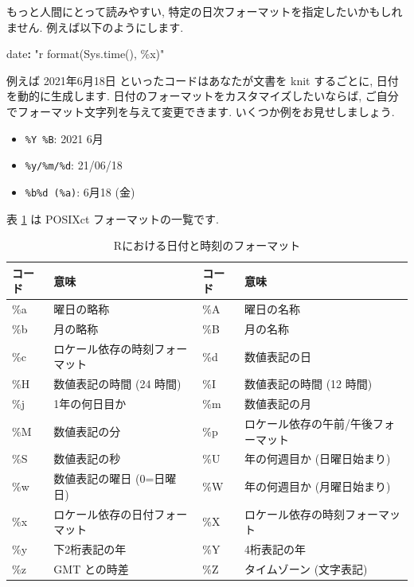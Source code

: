\documentclass[
  11pt,
  lualatex,
  ja=standard]{bxjsreport}
\newenvironment{Shaded}{\begin{snugshade}}{\end{snugshade}}
\newcommand{\AttributeTok}[1]{\textcolor[rgb]{0.77,0.63,0.00}{#1}}
\newcommand{\FunctionTok}[1]{\textcolor[rgb]{0.00,0.00,0.00}{#1}}
\newcommand{\KeywordTok}[1]{\textcolor[rgb]{0.13,0.29,0.53}{\textbf{#1}}}
\newcommand{\StringTok}[1]{\textcolor[rgb]{0.31,0.60,0.02}{#1}}
\providecommand{\tightlist}{%
  \setlength{\itemsep}{0pt}\setlength{\parskip}{0pt}}
\begin{document}
もっと人間にとって読みやすい, 特定の日次フォーマットを指定したいかもしれません. 例えば以下のようにします.

\begin{Shaded}
\begin{Highlighting}[]
\FunctionTok{date}\KeywordTok{:}\AttributeTok{ }\StringTok{"\textasciigrave{}r format(Sys.time(), \textquotesingle{}\%x\textquotesingle{})\textasciigrave{}"}
\end{Highlighting}
\end{Shaded}

例えば 2021年6月18日 といったコードはあなたが文書を knit するごとに, 日付を動的に生成します. 日付のフォーマットをカスタマイズしたいならば, ご自分でフォーマット文字列を与えて変更できます. いくつか例をお見せしましょう.

\begin{itemize}
\tightlist
\item
  \texttt{\%Y \%B}: 2021 6月
\item
  \texttt{\%y/\%m/\%d}: 21/06/18
\item
  \texttt{\%b\%d (\%a)}: 6月18 (金)
\end{itemize}

表 \ref{tab:date-format} は POSIXct フォーマットの一覧です.

\begin{table}
\caption{\label{tab:date-format} Rにおける日付と時刻のフォーマット}\tabularnewline
\begin{tabular}{llll}
\toprule
コード & 意味 & コード & 意味 \\
\midrule

\%a & 曜日の略称 & \%A & 曜日の名称 \\
\%b & 月の略称 & \%B & 月の名称 \\
\%c & ロケール依存の時刻フォーマット & \%d & 数値表記の日 \\
\%H & 数値表記の時間 (24 時間) & \%I & 数値表記の時間 (12 時間) \\
\%j & 1年の何日目か & \%m & 数値表記の月 \\
\%M & 数値表記の分 & \%p & ロケール依存の午前/午後フォーマット \\
\%S & 数値表記の秒 & \%U & 年の何週目か (日曜日始まり) \\
\%w & 数値表記の曜日 (0=日曜日) & \%W & 年の何週目か (月曜日始まり) \\
\%x & ロケール依存の日付フォーマット & \%X & ロケール依存の時刻フォーマット \\
\%y & 下2桁表記の年 & \%Y & 4桁表記の年 \\
\%z & GMT との時差 & \%Z & タイムゾーン (文字表記) \\
\bottomrule
\end{tabular}
\end{table}
\end{document}
